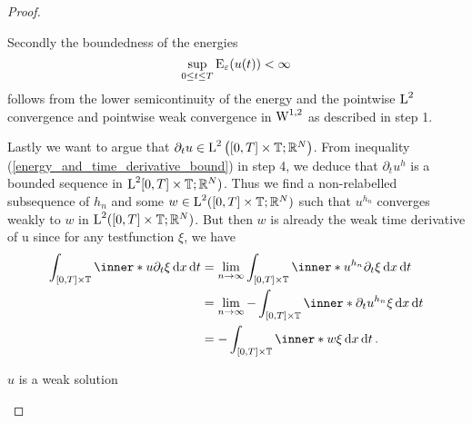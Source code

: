 \begin{proof}
\begin{description}[wide=0pt]
		Secondly the boundedness of the energies
		\begin{equation*}
			\sup_{ 0 \leq t \leq T }
			\operatorname{E}_{ \varepsilon } ( u ( t ) ) 
			< \infty
		\end{equation*}
		follows from the lower semicontinuity of the energy and the pointwise $ \operatorname{L}^{ 2 } $ convergence and pointwise weak convergence in $ \operatorname{W}^{ 1 , 2 } $ as described in step 1.
		
		Lastly we want to argue that $ \partial_{ t } u \in \operatorname{L}^{2 } \left( [ 0 , T ] \times \operatorname{\mathbb{T}} ; \mathbb{ R }^{ N } \right) $. From inequality (\ref{energy_and_time_derivative_bound}) in step 4, we deduce that $ \partial_{ t } u^{ h } $ is a bounded sequence in $ \operatorname{L}^{ 2 } [ 0 , T ] \times \operatorname{\mathbb{T}}; \mathbb{ R }^{ N } ) $. Thus we find a non-relabelled subsequence of $ h_{ n } $ and some $ w \in \operatorname{L}^{ 2 } ( [ 0 , T ] \times \operatorname{\mathbb{T}} ; \mathbb{ R }^{ N } ) $ such that $ u^{ h_{n } } $ converges weakly to $ w $ in $ \operatorname{L}^{ 2 } ( [0, T ] \times \operatorname{\mathbb{T}} ; \mathbb{ R }^{ N } ) $. But then $ w $ is already the weak time derivative of u since for any testfunction $ \xi $, we have
		\begin{align*}
			\int_{ [ 0 , T ] \times \flattorus }
			\inner*{ u }{ \partial_{ t } \xi }
			\dd{ x } \dd{ t }
			& =
			\lim_{ n \to \infty }
			\int_{ [ 0 , T ] \times \flattorus }
			\inner*{ u^{ h_{ n } } }{ \partial_{ t } \xi }
			\dd{ x } \dd{ t }
			\\
			& =
			\lim_{n \to \infty }
			- \int_{ [ 0 , T ] \times \flattorus }
			\inner*{ \partial_{ t } u^{ h_{ n } } }{ \xi }
			\dd{ x }\dd{ t }
			\\
			& =
			- \int_{ [ 0 , T ] \times \flattorus }
			\inner*{ w }{ \xi }
			\dd{ x } \dd{ t }.
		\end{align*}
		
		\item[Step 7:] $ u $ is a weak solution
		

\end{description}
\end{proof}

